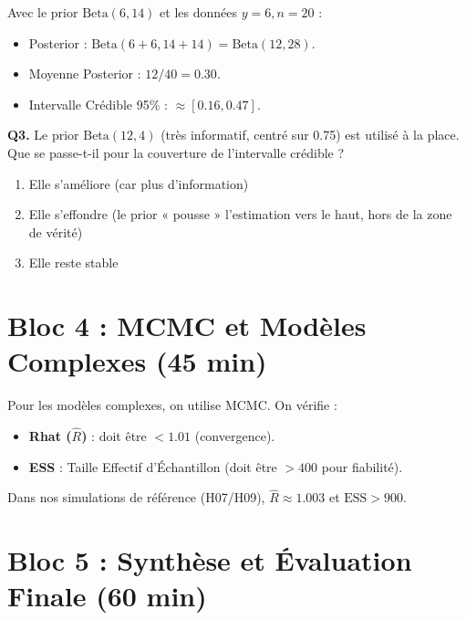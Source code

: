 \documentclass[11pt,a4paper]{article}
\begin{document}
\begin{application}
Avec le prior $\text{Beta}(6,14)$ et les données $y=6, n=20$ :
\begin{itemize}
    \item Posterior : $\text{Beta}(6+6, 14+14) = \text{Beta}(12, 28)$.
    \item Moyenne Posterior : $12/40 = 0.30$.
    \item Intervalle Crédible 95\% : $\approx [0.16, 0.47]$.
\end{itemize}
\end{application}

\begin{qcmbox}
\textbf{Q3.} Le prior $\text{Beta}(12, 4)$ (très informatif, centré sur 0.75) est utilisé à la place. Que se passe-t-il pour la couverture de l'intervalle crédible ?
\begin{enumerate}[label=\Alph*.)]
    \item Elle s'améliore (car plus d'information)
    \item Elle s'effondre (le prior « pousse » l'estimation vers le haut, hors de la zone de vérité)
    \item Elle reste stable
\end{enumerate}
\end{qcmbox}

\section{Bloc 4 : MCMC et Modèles Complexes (45 min)}

\begin{rappel}
Pour les modèles complexes, on utilise MCMC. On vérifie :
\begin{itemize}
    \item \textbf{Rhat ($\hat{R}$)} : doit être $< 1.01$ (convergence).
    \item \textbf{ESS} : Taille Effectif d'Échantillon (doit être $> 400$ pour fiabilité).
\end{itemize}
Dans nos simulations de référence (H07/H09), $\hat{R} \approx 1.003$ et $\text{ESS} > 900$.
\end{rappel}

\section{Bloc 5 : Synthèse et Évaluation Finale (60 min)}
\end{document}

